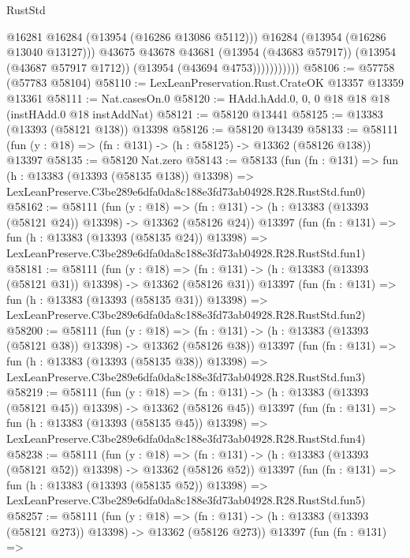 \begin{lexlean}{RustStd}
\begin{coremodule}
                          @16281
                          @16284
                          (@13954 (@16286 @13086 @5112)))
                        @16284
                        (@13954 (@16286 @13040 @13127)))
                      @43675
                      @43678
                      @43681
                      (@13954 (@43683 @57917))
                      (@13954 (@43687 @57917 @1712))
                      (@13954 (@43694 @4753)))))))))))
@58106 := @57758 (@57783 @58104)
@58110 := LexLeanPreservation.Rust.CrateOK @13357 @13359 @13361
@58111 := Nat.casesOn.{0}
@58120 := HAdd.hAdd.{0, 0, 0} @18 @18 @18 (instHAdd.{0} @18 instAddNat)
@58121 := @58120 @13441
@58125 := @13383 (@13393 (@58121 @138)) @13398
@58126 := @58120 @13439
@58133 := @58111 (fun (y : @18) => (fn : @131) -> (h : @58125) -> @13362 (@58126 @138)) @13397
@58135 := @58120 Nat.zero
@58143 := @58133
    (fun (fn : @131) =>
    fun (h : @13383 (@13393 (@58135 @138)) @13398) =>
    LexLeanPreserve.C3be289e6dfa0da8c188e3fd73ab04928.R28.RustStd.fun0)
@58162 := @58111
    (fun (y : @18) =>
    (fn : @131) -> (h : @13383 (@13393 (@58121 @24)) @13398) -> @13362 (@58126 @24))
    @13397
    (fun (fn : @131) =>
    fun (h : @13383 (@13393 (@58135 @24)) @13398) =>
    LexLeanPreserve.C3be289e6dfa0da8c188e3fd73ab04928.R28.RustStd.fun1)
@58181 := @58111
    (fun (y : @18) =>
    (fn : @131) -> (h : @13383 (@13393 (@58121 @31)) @13398) -> @13362 (@58126 @31))
    @13397
    (fun (fn : @131) =>
    fun (h : @13383 (@13393 (@58135 @31)) @13398) =>
    LexLeanPreserve.C3be289e6dfa0da8c188e3fd73ab04928.R28.RustStd.fun2)
@58200 := @58111
    (fun (y : @18) =>
    (fn : @131) -> (h : @13383 (@13393 (@58121 @38)) @13398) -> @13362 (@58126 @38))
    @13397
    (fun (fn : @131) =>
    fun (h : @13383 (@13393 (@58135 @38)) @13398) =>
    LexLeanPreserve.C3be289e6dfa0da8c188e3fd73ab04928.R28.RustStd.fun3)
@58219 := @58111
    (fun (y : @18) =>
    (fn : @131) -> (h : @13383 (@13393 (@58121 @45)) @13398) -> @13362 (@58126 @45))
    @13397
    (fun (fn : @131) =>
    fun (h : @13383 (@13393 (@58135 @45)) @13398) =>
    LexLeanPreserve.C3be289e6dfa0da8c188e3fd73ab04928.R28.RustStd.fun4)
@58238 := @58111
    (fun (y : @18) =>
    (fn : @131) -> (h : @13383 (@13393 (@58121 @52)) @13398) -> @13362 (@58126 @52))
    @13397
    (fun (fn : @131) =>
    fun (h : @13383 (@13393 (@58135 @52)) @13398) =>
    LexLeanPreserve.C3be289e6dfa0da8c188e3fd73ab04928.R28.RustStd.fun5)
@58257 := @58111
    (fun (y : @18) =>
    (fn : @131) -> (h : @13383 (@13393 (@58121 @273)) @13398) -> @13362 (@58126 @273))
    @13397
    (fun (fn : @131) =>

\end{coremodule}
\end{lexlean}
